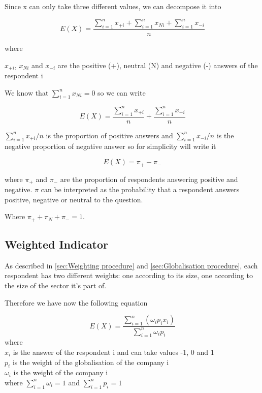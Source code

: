 \documentclass[12pt,a4paper,oneside]{book}
\begin{document}
Since x can only take three different values, we can decompose it into 

\begin{equation}
    E(X) = \frac{ \sum_{i=1}^n x_{+i} + \sum_{i=1}^n x_{Ni} + \sum_{i=1}^n x_{-i}}{n}
\end{equation} 

where 

$x_{+i}$, $x_{Ni}$ and $x_{-i}$ are the positive (+), neutral (N) and negative (-) answers of the respondent i

We know that $\sum_{i=1}^n x_{Ni} = 0$ so we can write

\begin{equation}
    E(X) = \frac{\sum_{i=1}^n x_{+i}}{n}  + \frac{\sum_{i=1}^n x_{-i}}{n}
\end{equation} 

${\sum_{i=1}^n x_{+i}}/{n}$ is the proportion of positive answers and ${\sum_{i=1}^n x_{-i}}/{n}$ is the negative proportion of negative answer so for simplicity will write it 

\begin{equation}
    E(X) = \pi_+ - \pi_-
\end{equation}

where $\pi_+$ and $\pi_-$ are the proportion of respondents answering positive and negative. 
$\pi$ can be interpreted as the probability that a respondent answers positive, negative or neutral to the question. 

Where $\pi_+ + \pi_N + \pi_- =1$.


\subsection{Weighted Indicator}

As described in \autoref{sec:Weighting procedure} and \autoref{sec:Globalisation procedure}, each respondent has two different weights: one according to its size, one according to the size of the sector it's part of.

Therefore we have now the following equation

\begin{equation}
    E(X) = \frac{ \sum_{i=1}^n \left(\omega_i p_i x_i \right)}{\sum_{i=1}^n \omega_i p_i}
\end{equation} 
where \\
$x_i$ is the answer of the respondent i and can take values -1, 0 and 1 \\
$p_i$ is the weight of the globalisation of the company i \\
$\omega_i$ is the weight of the company i \\
where $\sum_{i=1}^n \omega_i = 1$ and $\sum_{i=1}^n p_i = 1$
\end{document}
